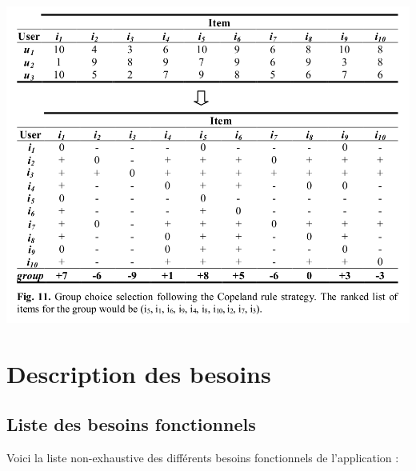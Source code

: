 \documentclass[12pt, openany]{report}
\begin{document}
\begin{itemize}
\includegraphics[scale=0.4]{images/copeland_.png}
\\

\end{itemize}

\section{Description des besoins}

\subsection{Liste des besoins fonctionnels}
Voici la liste non-exhaustive des différents besoins fonctionnels de l'application :
\end{document}
